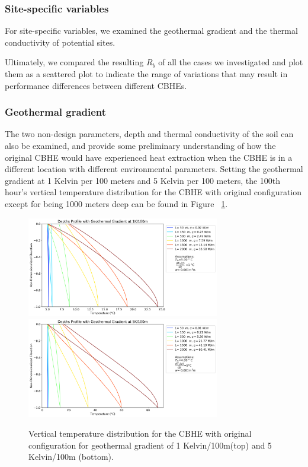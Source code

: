 	\subsubsection{Site-specific variables}
		For site-specific variables, we examined the geothermal gradient and the thermal conductivity of potential sites. 
		
		Ultimately, we compared the resulting $R_b$ of all the cases we investigated and plot them as a scattered plot to indicate the range of variations that may result in performance differences between different CBHEs. 
		
		\subsubsection{Geothermal gradient}
		The two non-design parameters, depth and thermal conductivity of the soil can also be examined, and provide some preliminary understanding of how the original CBHE 	would have experienced heat extraction when the CBHE is in a different location with different environmental parameters. Setting the geothermal gradient at 1 Kelvin per 100 meters and 5 Kelvin per 100 meters, the 100th hour’s vertical temperature distribution for the CBHE with original configuration except for being 1000 meters deep can be found in Figure ~\ref{fig:GG}.
	    \begin{figure}[h!]
	        \centering
	        \includegraphics[width=0.75\textwidth]{depths_5_1k.png}
	        \includegraphics[width=0.75\textwidth]{depths_5_5k.png}
	        \caption{Vertical temperature distribution for the CBHE with original configuration for geothermal gradient of 1 Kelvin/100m(top) and 5 Kelvin/100m (bottom).}
	        \label{fig:GG}
	    \end{figure}
	    
